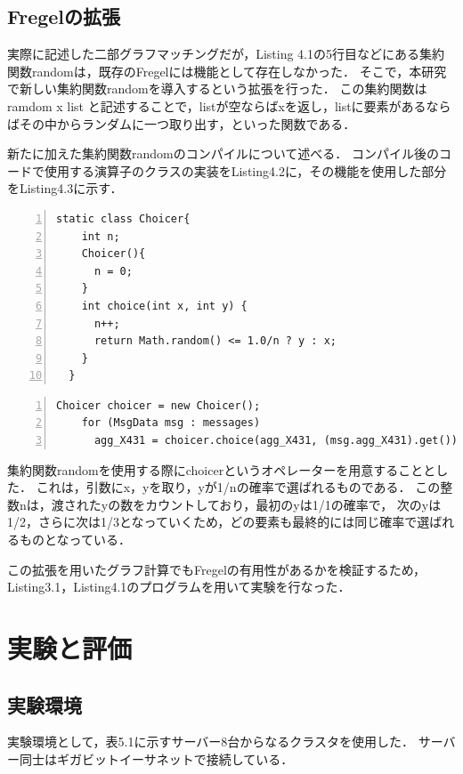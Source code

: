 \documentclass[12pt]{ujreport}
\begin{document}
\section{Fregelの拡張}
実際に記述した二部グラフマッチングだが，Listing 4.1の5行目などにある集約関数randomは，既存のFregelには機能として存在しなかった．
そこで，本研究で新しい集約関数randomを導入するという拡張を行った．
この集約関数はramdom x list と記述することで，listが空ならばxを返し，listに要素があるならばその中からランダムに一つ取り出す，といった関数である．

新たに加えた集約関数randomのコンパイルについて述べる．
コンパイル後のコードで使用する演算子のクラスの実装をListing4.2に，その機能を使用した部分をListing4.3に示す．

\begin{lstlisting}[basicstyle=\ttfamily\footnotesize, frame = single,  numbers = left, tabsize = 3, captionpos = b, caption = {ランダム選択のオペレーターの準備}]
  static class Choicer{
    int n;
    Choicer(){
      n = 0;
    }
    int choice(int x, int y) {
      n++;
      return Math.random() <= 1.0/n ? y : x;
    }
  }

\end{lstlisting}

\begin{lstlisting}[basicstyle=\ttfamily\footnotesize, frame = single,  numbers = left, tabsize = 3, captionpos = b, caption = {ランダム選択を使用した箇所}]
  Choicer choicer = new Choicer();
    for (MsgData msg : messages)
      agg_X431 = choicer.choice(agg_X431, (msg.agg_X431).get());

\end{lstlisting}

集約関数randomを使用する際にchoicerというオペレーターを用意することとした．
これは，引数にx，yを取り，yが1/nの確率で選ばれるものである．
この整数nは，渡されたyの数をカウントしており，最初のyは1/1の確率で，
次のyは1/2，さらに次は1/3となっていくため，どの要素も最終的には同じ確率で選ばれるものとなっている．

この拡張を用いたグラフ計算でもFregelの有用性があるかを検証するため，Listing3.1，Listing4.1のプログラムを用いて実験を行なった．

\newpage

\chapter{実験と評価}
\section{実験環境}
実験環境として，表5.1に示すサーバー8台からなるクラスタを使用した．
サーバー同士はギガビットイーサネットで接続している．
\end{document}
